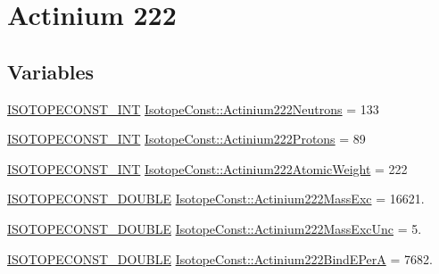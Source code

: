 \hypertarget{group___isotope_const-_actinium-_ac222}{}\section{Actinium 222}
\label{group___isotope_const-_actinium-_ac222}
\subsection*{Variables}
\begin{DoxyCompactItemize}
\item 
\mbox{\hyperlink{group___isotope_const-_macros_ga5f18360b3e99483a35c32d789e62621c}{I\+S\+O\+T\+O\+P\+E\+C\+O\+N\+S\+T\+\_\+\+I\+NT}} \mbox{\hyperlink{group___isotope_const-_actinium-_ac222_ga553c4704e267e922136a83586ee62492}{Isotope\+Const\+::\+Actinium222\+Neutrons}} = 133
\item 
\mbox{\hyperlink{group___isotope_const-_macros_ga5f18360b3e99483a35c32d789e62621c}{I\+S\+O\+T\+O\+P\+E\+C\+O\+N\+S\+T\+\_\+\+I\+NT}} \mbox{\hyperlink{group___isotope_const-_actinium-_ac222_ga545790ccaa58b5b455014df2820621e5}{Isotope\+Const\+::\+Actinium222\+Protons}} = 89
\item 
\mbox{\hyperlink{group___isotope_const-_macros_ga5f18360b3e99483a35c32d789e62621c}{I\+S\+O\+T\+O\+P\+E\+C\+O\+N\+S\+T\+\_\+\+I\+NT}} \mbox{\hyperlink{group___isotope_const-_actinium-_ac222_ga1b3e4ed6634cabfe74b4429b8f76c14b}{Isotope\+Const\+::\+Actinium222\+Atomic\+Weight}} = 222
\item 
\mbox{\hyperlink{group___isotope_const-_macros_ga8f45a7272ce02c0b4c65c44636ed719a}{I\+S\+O\+T\+O\+P\+E\+C\+O\+N\+S\+T\+\_\+\+D\+O\+U\+B\+LE}} \mbox{\hyperlink{group___isotope_const-_actinium-_ac222_ga70e9d59a0812d6e422a9abe5fa11279e}{Isotope\+Const\+::\+Actinium222\+Mass\+Exc}} = 16621.
\item 
\mbox{\hyperlink{group___isotope_const-_macros_ga8f45a7272ce02c0b4c65c44636ed719a}{I\+S\+O\+T\+O\+P\+E\+C\+O\+N\+S\+T\+\_\+\+D\+O\+U\+B\+LE}} \mbox{\hyperlink{group___isotope_const-_actinium-_ac222_ga065b5d58991991f4335b3da3ea882912}{Isotope\+Const\+::\+Actinium222\+Mass\+Exc\+Unc}} = 5.
\item 
\mbox{\hyperlink{group___isotope_const-_macros_ga8f45a7272ce02c0b4c65c44636ed719a}{I\+S\+O\+T\+O\+P\+E\+C\+O\+N\+S\+T\+\_\+\+D\+O\+U\+B\+LE}} \mbox{\hyperlink{group___isotope_const-_actinium-_ac222_ga5acdaf0ac8342013f011a0b4596928e3}{Isotope\+Const\+::\+Actinium222\+Bind\+E\+PerA}} = 7682.
\item 

\end{DoxyCompactItemize}
